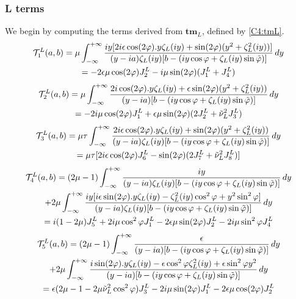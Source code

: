 \subsubsection{L terms}
We begin by computing the terms derived from $\mathbf{tm}_L$, defined by \eqref{C4:tmL}.
\begin{multline}
\mathcal{T}_1^L(a,b)= \mu \int_{-\infty}^{+\infty} \frac{iy\lbrack 2i\epsilon\cos(2\varphi).y\zeta_L(iy)+\sin(2\varphi)(y^2+\zeta_L^2(iy))\rbrack}{(y-ia)\zeta_L(iy)\lbrack b- (iy\cos \varphi+ \zeta_L(iy)\sin\phiti) \rbrack} \, dy \\
\hfill =-2\epsilon\mu\cos(2\varphi)J_2^L-i\mu\sin(2\varphi)(J_1^L+J_4^L) \hfill
\end{multline}
\begin{multline}
\mathcal{T}_2^L(a,b)=\mu \int_{-\infty}^{+\infty} \frac{2i \cos(2\varphi).y\zeta_L(iy)+\epsilon \sin(2\varphi)(y^2+\zeta_L^2(iy))}{(y-ia)\lbrack b- (iy\cos \varphi+\zeta_L(iy)\sin\phiti )\rbrack} \, dy \\
\hfill =-2i\mu\cos(2\varphi)J_1^L+\epsilon\mu\sin(2\varphi)(2J_2^L+\nuti_L^2J_3^L) \hfill
\end{multline}
\begin{multline}
\mathcal{T}_3^L(a,b)=\mu\tau \int_{-\infty}^{+\infty} \frac{ 2i\epsilon\cos(2\varphi).y\zeta_L(iy)+\sin(2\varphi)(y^2+\zeta_L^2(iy))}{(y-ia)\zeta_L(iy)\lbrack b- (iy\cos \varphi+ \zeta_L(iy)\sin \phiti) \rbrack} \, dy \\
\hfill =\mu\tau \lbrack 2i\epsilon\cos(2\varphi)J_6^L-\sin(2\varphi)(2J_7^L+\nuti_L^2J_8^L) \rbrack \hfill
\end{multline}
\begin{multline}
\mathcal{T}_4^L(a,b)= (2\mu-1) \int_{-\infty}^{+\infty}\frac{iy}{(y-ia)\zeta_L(iy)\lbrack b-(iy\cos \varphi+\zeta_L(iy)\sin\phiti) \rbrack} \, dy \\
+2 \mu\int_{-\infty}^{+\infty} \frac{iy\lbrack i\epsilon\sin(2\varphi).y\zeta_L(iy)-\zeta_L^2(iy)\cos^2\varphi+y^2\sin^2\varphi \rbrack}{(y-ia)\zeta_L(iy)\lbrack b- (iy\cos \varphi+\zeta_L(iy)\sin\phiti) \rbrack} \, dy\\
\hfill=i(1-2\mu)J_5^L+2i\mu\cos^2\varphi J_1^L-2\epsilon\mu\sin(2\varphi)J_2^L-2i\mu\sin^2\varphi J_4^L \hfill
\end{multline}
\begin{multline}
\mathcal{T}_5^L(a,b)= (2\mu-1) \int_{-\infty}^{+\infty}\frac{\epsilon}{(y-ia)\lbrack b- (iy\cos \varphi+\zeta_L(iy)\sin\phiti) \rbrack} \, dy \\
+2\mu\int_{-\infty}^{+\infty} \frac{ i\sin(2\varphi).y\zeta_L(iy)-\epsilon \cos^2\varphi \zeta_L^2(iy)+\epsilon \sin^2\varphi y^2}{(y-ia)\lbrack b- (iy\cos \varphi+\zeta_L(iy)\sin\phiti) \rbrack} \, dy \\
\hfill=\epsilon(2\mu-1-2\mu\nuti_L^2\cos^2\varphi)J_3^L-2i\mu\sin(2\varphi)J_1^L-2\epsilon\mu\cos(2\varphi)J_2^L\hfill
\end{multline}
